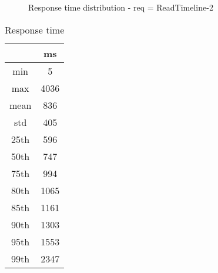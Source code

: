 \begin{minipage}{0.75\linewidth}
\begin{figure}[h]
\begin{adjustbox}{max width=1.0\linewidth, keepaspectratio}
  \end{adjustbox}
  \caption{Response time distribution - req = ReadTimeline-2}
\end{figure}
\end{minipage}\hfill\begin{minipage}{0.18\linewidth}
\begin{table}[h]
\begin{tabular}{|cc|}
\hline
\textbf{} & \textbf{ms}\\ \hline
 \Xhline{0.005\arrayrulewidth}
min & 5\\
 \Xhline{0.005\arrayrulewidth}
max & 4036\\
 \Xhline{0.005\arrayrulewidth}
mean & 836\\
 \Xhline{0.005\arrayrulewidth}
std & 405\\
\hline
\hline
 \Xhline{0.005\arrayrulewidth}
25th & 596\\
 \Xhline{0.005\arrayrulewidth}
50th & 747\\
 \Xhline{0.005\arrayrulewidth}
75th & 994\\
 \Xhline{0.005\arrayrulewidth}
80th & 1065\\
 \Xhline{0.005\arrayrulewidth}
85th & 1161\\
 \Xhline{0.005\arrayrulewidth}
90th & 1303\\
 \Xhline{0.005\arrayrulewidth}
95th & 1553\\
 \Xhline{0.005\arrayrulewidth}
99th & 2347\\
\hline
\end{tabular}
\caption{Response time}
\end{table}
\end{minipage}\hfill